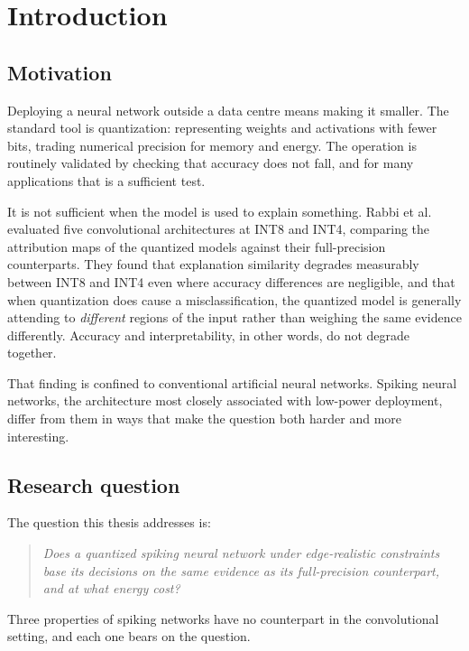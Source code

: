 \chapter{Introduction}
\label{ch:introduction}

\section{Motivation}

Deploying a neural network outside a data centre means making it smaller. The
standard tool is quantization: representing weights and activations with fewer
bits, trading numerical precision for memory and energy. The operation is
routinely validated by checking that accuracy does not fall, and for many
applications that is a sufficient test.

It is not sufficient when the model is used to explain something. Rabbi et
al.~\cite{rabbi2026} evaluated five convolutional architectures at INT8 and
INT4, comparing the attribution maps of the quantized models against their
full-precision counterparts. They found that explanation similarity degrades
measurably between INT8 and INT4 even where accuracy differences are negligible,
and that when quantization does cause a misclassification, the quantized model
is generally attending to \emph{different} regions of the input rather than
weighing the same evidence differently. Accuracy and interpretability, in other
words, do not degrade together.

That finding is confined to conventional artificial neural networks. Spiking
neural networks, the architecture most closely associated with low-power
deployment, differ from them in ways that make the question both harder and more
interesting.

\section{Research question}

The question this thesis addresses is:

\begin{quote}
\emph{Does a quantized spiking neural network under edge-realistic constraints
base its decisions on the same evidence as its full-precision counterpart, and
at what energy cost?}
\end{quote}

Three properties of spiking networks have no counterpart in the convolutional
setting, and each one bears on the question.

